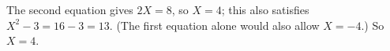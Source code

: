 The second equation gives $2X=8$, so $X=4$; this also satisfies $X^2-3=16-3=13$. (The first equation alone would also allow $X=-4$.) So $X=\boxed{4}$.
